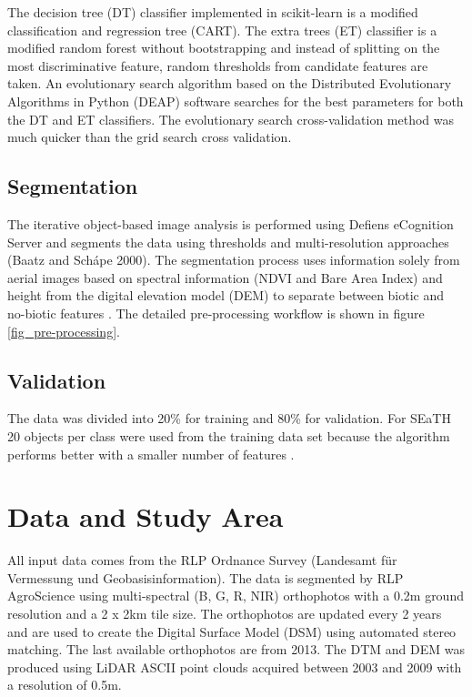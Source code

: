 \documentclass[authoryear, review,12pt,number]{elsarticle}
\begin{document}
The decision tree (DT) classifier implemented in scikit-learn is a modified
classification and regression tree (CART)\citep{scikit-learn}. The extra trees
(ET) classifier is a modified random forest without bootstrapping and instead of
splitting on the most discriminative feature, random thresholds from candidate
features are taken.
An evolutionary search algorithm based on the Distributed Evolutionary
Algorithms in Python (DEAP) \citep{DEAP_JMLR2012} software searches
for the best parameters for both the DT and ET classifiers. The evolutionary
search cross-validation method was much quicker than the grid search cross
validation. 
\subsection{Segmentation} 
\label{subsec_segmentation}
The iterative object-based image analysis is performed using Defiens eCognition
Server and segments the data using thresholds and multi-resolution approaches
(Baatz and Sch\'ape 2000). The segmentation process uses information solely from
aerial images based on spectral information (NDVI and Bare Area Index) and
height from the digital elevation model (DEM) to separate between biotic and
no-biotic features \citep{Tintrup2015}. The detailed pre-processing workflow is
shown in figure \ref{fig_pre-processing}.
\subsection{Validation} 
The data was divided into 20\% for training and 80\% for validation. For SEaTH
20 objects per class were used from the training data set because the algorithm
performs better with a smaller number of features \citep{Nussbaum2006}. 
\section{Data and Study Area}
All input data comes from the RLP Ordnance Survey (Landesamt f\"ur Vermessung 
und Geobasisinformation). The data is segmented by RLP AgroScience using
multi-spectral (B, G, R, NIR) orthophotos with a 0.2m ground resolution and a
2 x 2km tile size. The orthophotos are updated every 2 years and are used to
create the Digital Surface Model (DSM) using automated stereo matching. The
last available orthophotos are from 2013. The DTM and
DEM was produced using LiDAR ASCII point clouds acquired between 2003 and 2009
with a resolution of 0.5m.\\
\end{document}
